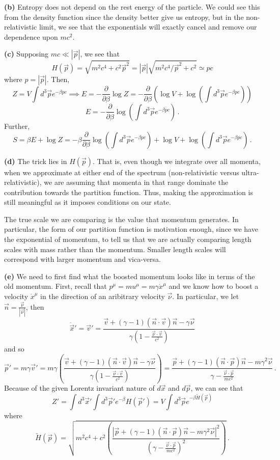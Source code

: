 \documentclass[10pt]{article}
\newcommand{\di}[2][]{\frac{\partial #1}{\partial #2}}
\begin{document}
\textbf{(b)} Entropy does not depend on the rest energy of the particle. We could see this from the density function since the density better give us entropy, but in the non-relativistic limit, we see that the exponentials will exactly cancel and remove our dependence upon $mc^{2}$.

\textbf{(c)} Supposing $mc \ll |\vec{p}|$, we see that
\[ H(\vec{p}) = \sqrt{m^{2}c^{4} + c^{2}\vec{p}^{2}} = |\vec{p}|\sqrt{m^{2}c^{4}/\vec{p}^{2} + c^{2}} \simeq pc\]
where $p = |\vec{p}|$. Then, 
\[ Z = V\int d^{3}\vec{p}e^{-\beta pc} \implies E = -\di{\beta}\log Z = -\di{\beta} \left(\log V + \log\left( \int d^{3} \vec{p} e^{-\beta pc}\right) \right) \]
\[ E = -\di{\beta}\log\left(\int d^{3}\vec{p}e^{-\beta pc}\right) \, . \]
Further,
\[ S = \beta E + \log Z = -\beta \di{\beta}\log\left(\int d^{3}\vec{p}e^{-\beta pc}\right) + \log V + \log \left(\int d^{3}\vec{p} e^{-\beta pc}\right) \, . \]

\textbf{(d)} The trick lies in $H(\vec{p})$. That is, even though we integrate over all momenta, when we approximate at either end of the spectrum (non-relativistic versus ultra-relativistic), we are assuming that momenta in that range dominate the contribution towards the partition function. Thus, making the approximation is still meaningful as it imposes conditions on our state.

The true scale we are comparing is the value that momentum generates. In particular, the form of our partition function is motivation enough, since we have the exponential of momentum, to tell us that we are actually comparing length scales with mass rather than the momentum. Smaller length scales will correspond with larger momentum and vica-versa.

\textbf{(e)} We need to first find what the boosted momentum looks like in terms of the old momentum. First, recall that $p^{\mu} = mu^{\mu} = m\gamma \dot{x}^{\mu}$ and we know how to boost a velocity $\dot{x}^{\mu}$ in the direction of an aribitrary velocity $\vec{\nu}$. In particular, we let $\vec{n} = \frac{\vec{\nu}}{|\vec{\nu}|}$, then
\[ \dot{\vec{x}}' = \vec{v}' = \frac{\vec{v}+ (\gamma - 1)(\vec{n}\cdot \vec{v})\vec{n} - \gamma \vec{\nu}}{\gamma(1- \frac{\vec{\nu}\cdot \vec{v}}{c^{2}})} \]
and so
\[ \vec{p}' = m\gamma \vec{v}' = m\gamma \left(\frac{\vec{v}+ (\gamma - 1)(\vec{n}\cdot \vec{v})\vec{n} - \gamma \vec{\nu}}{\gamma(1- \frac{\vec{\nu}\cdot \vec{v}}{c^{2}})}\right) = \frac{\vec{p}+ (\gamma - 1)(\vec{n}\cdot \vec{p})\vec{n} - m\gamma^{2} \vec{\nu}}{\gamma - \frac{\vec{\nu}\cdot \vec{p}}{mc^{2}}} \, .\]
Because of the given Lorentz invariant nature of $d\vec{x}$ and $d\vec{p}$, we can see that
\[ Z' = \int d^{3}\vec{x}'\int d^{3}\vec{p}'e^{-\beta}H(\vec{p}') = V\int d^{3}\vec{p}e^{-\beta \tilde{H}(\vec{p})}\]
where
\[ \tilde{H}(\vec{p}) = \sqrt{m^{2}c^{4} + c^{2}\left(\frac{|\vec{p}+ (\gamma - 1)(\vec{n}\cdot \vec{p})\vec{n} - m\gamma^{2} \vec{\nu}|^{2}}{(\gamma - \frac{\vec{\nu}\cdot \vec{p}}{mc^{2}})^{2}}\right)} \, .\]
\end{document}
